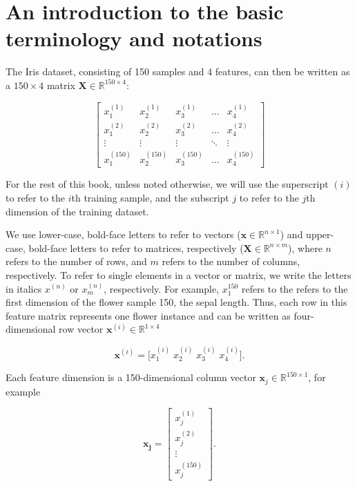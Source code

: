 \documentclass[letterpaper]{report}
\begin{document}
\section{An introduction to the basic terminology and notations}

\newpage

The Iris dataset, consisting of 150 samples and 4 features, can then be written as a $150 \times 4$ matrix $\mathbf{X} \in \mathbb{R}^{150 \times 4}:$

\[
\begin{bmatrix}
    x_{1}^{(1)} & x_{2}^{(1)} & x_{3}^{(1)} & \dots  & x_{4}^{(1)} \\
    x_{1}^{(2)} & x_{2}^{(2)} & x_{3}^{(2)} & \dots  & x_{4}^{(2)} \\
    \vdots & \vdots & \vdots & \ddots & \vdots \\
    x_{1}^{(150)} & x_{2}^{(150)} & x_{3}^{(150)} & \dots  & x_{4}^{(150)}
\end{bmatrix}
\]

For the rest of this book, unless noted otherwise, we will use the superscript $(i)$ to refer to the $i$th training sample, and the subscript $j$ to refer to the $j$th dimension of the training dataset. 

We use lower-case, bold-face letters to refer to vectors ($\mathbf{x} \in \mathbb{R}^{n \times 1}$) and upper-case, bold-face letters to refer to matrices, respectively ($\mathbf{X} \in \mathbb{R}^{n \times m}$), where $n$ refers to the number of rows, and $m$ refers to the number of columns, respectively. To refer to single elements in a vector or matrix, we write the letters in italics $x^{(n)}$ or $x^{(n)}_{m}$, respectively. For example, $x^{150}_1$ refers to the refers to the first dimension of the flower sample 150, the sepal length. Thus, each row in this feature matrix represents one flower instance and can be written as four-dimensional row vector $\mathbf{x}^{(i)} \in \mathbb{R}^{1 \times 4}$

\[ \mathbf{x}^{(i)} = \bigg[x^{(i)}_1 \; x^{(i)}_2 \; x^{(i)}_3 \; x^{(i)}_4 \bigg]. \]

Each feature dimension is a 150-dimensional column vector $\mathbf{x}_{j} \in \mathbb{R}^{150 \times 1}$, for example

\[
\mathbf{x_j} = \begin{bmatrix}
    x_{j}^{(1)}  \\
    x_{j}^{(2)}  \\
    \vdots  \\
    x_{j}^{(150)}
\end{bmatrix}
.\]
\end{document}
